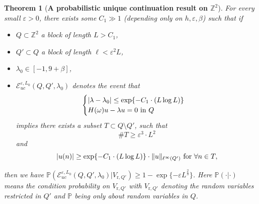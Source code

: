 \documentclass[11pt,reqno,UTF8,twoside]{amsart}
\newcommand{\Z}{\mathbb{Z}}
\renewcommand{\P}{\mathbb{P}}
\newcommand{\mcE}{\mathcal{E}}
\newtheorem{thm}{Theorem}[section]
\theoremstyle{definition}
\numberwithin{equation}{section}
\begin{document}
\begin{thm}[{\bf A probabilistic unique continuation result on $\Z^2$}]\label{UC for d=2}
For every small $\varepsilon>0$, there exists some  $C_1 \gg 1$ (depending  only on $h,\varepsilon,\beta$) such that if 
\begin{itemize}
  \item [(1)] $Q \subset\Z^2$ a block of  length $L> C_1$,
  \item [(2)] $Q' \subset Q$ a block  of length $\ell <\varepsilon^{2} L$,
  \item [(3)] $\lambda_0\in [-1,9+\beta]$,
  \item [(4)] $\mcE_{uc}^{\varepsilon,L_0}(Q,Q',\lambda_0)$ denotes  the event that
    \begin{equation*}
          \begin{cases}
            |\lambda-\lambda_0|\leq \exp\{-C_1 \cdot (L \log L)\} \\
            H(\omega)u-\lambda u=0 \ {\rm in} \ Q\\
          \end{cases}      
    \end{equation*}    
    implies there exists a subset $T\subset Q\setminus Q'$, such that 
  \begin{equation}\label{transversality set, d=2}
        \# T\geq \varepsilon^3  \cdot L^2
  \end{equation}
  and 
  \begin{equation}\label{transversality, d=2}
      |u(n)| \geq \exp\{-C_1 \cdot (L\log L) \} \cdot \| u\|_{\ell^{\infty}(Q')} \ {\rm for} \ \forall n\in T,
  \end{equation}
\end{itemize}
then we have $\P(\mcE_{uc}^{\varepsilon,L_0}(Q,Q',\lambda_0)|V_{\text{r},Q'})\geq 1 -\exp\{ -\varepsilon L^{\frac{2}{3}}\}$. Here $\P(\cdot|\cdot)$ means  the condition probability on $V_{\text{r},Q'}$ with $V_{\text{r},Q'}$  denoting the random variables restricted in $Q'$ and $\P$ being  only about random variables in $Q$.
\end{thm}
\end{document}

